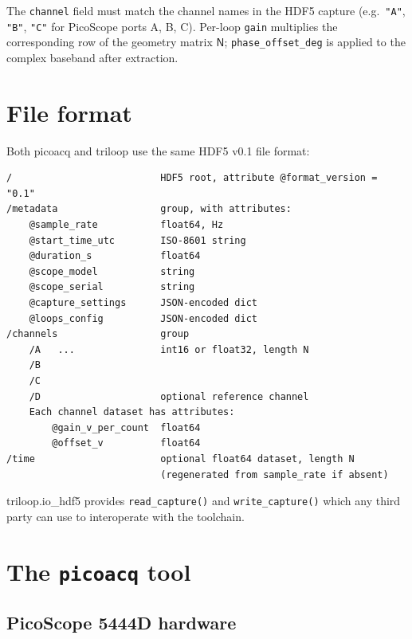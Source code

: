 \documentclass[11pt]{article}
\begin{document}
The \texttt{channel} field must match the channel names in the HDF5
capture (e.g.\ \texttt{"A"}, \texttt{"B"}, \texttt{"C"} for PicoScope
ports A, B, C).  Per-loop \texttt{gain} multiplies the corresponding
row of the geometry matrix \(\mathsf{N}\); \texttt{phase\_offset\_deg}
is applied to the complex baseband after extraction.

\section{File format}
\label{sec:fileformat}

Both \textsf{picoacq} and \textsf{triloop} use the same HDF5
v0.1 file format:

\begin{lstlisting}[style=shell]
/                          HDF5 root, attribute @format_version = "0.1"
/metadata                  group, with attributes:
    @sample_rate           float64, Hz
    @start_time_utc        ISO-8601 string
    @duration_s            float64
    @scope_model           string
    @scope_serial          string
    @capture_settings      JSON-encoded dict
    @loops_config          JSON-encoded dict
/channels                  group
    /A   ...               int16 or float32, length N
    /B
    /C
    /D                     optional reference channel
    Each channel dataset has attributes:
        @gain_v_per_count  float64
        @offset_v          float64
/time                      optional float64 dataset, length N
                           (regenerated from sample_rate if absent)
\end{lstlisting}

\textsf{triloop.io\_hdf5} provides \texttt{read\_capture()} and
\texttt{write\_capture()} which any third party can use to interoperate
with the toolchain.

\section{The \texttt{picoacq} tool}

\subsection{PicoScope 5444D hardware}
\label{sec:picohardware}
\end{document}
